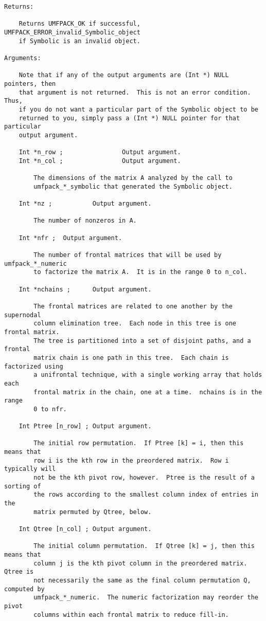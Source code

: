 {\begin{verbatim}
Returns:

    Returns UMFPACK_OK if successful, UMFPACK_ERROR_invalid_Symbolic_object
    if Symbolic is an invalid object.

Arguments:

    Note that if any of the output arguments are (Int *) NULL pointers, then
    that argument is not returned.  This is not an error condition.  Thus,
    if you do not want a particular part of the Symbolic object to be
    returned to you, simply pass a (Int *) NULL pointer for that particular
    output argument.

    Int *n_row ;                Output argument.
    Int *n_col ;                Output argument.

        The dimensions of the matrix A analyzed by the call to
        umfpack_*_symbolic that generated the Symbolic object.

    Int *nz ;           Output argument.

        The number of nonzeros in A.

    Int *nfr ;  Output argument.

        The number of frontal matrices that will be used by umfpack_*_numeric
        to factorize the matrix A.  It is in the range 0 to n_col.

    Int *nchains ;      Output argument.

        The frontal matrices are related to one another by the supernodal
        column elimination tree.  Each node in this tree is one frontal matrix.
        The tree is partitioned into a set of disjoint paths, and a frontal
        matrix chain is one path in this tree.  Each chain is factorized using
        a unifrontal technique, with a single working array that holds each
        frontal matrix in the chain, one at a time.  nchains is in the range
        0 to nfr.

    Int Ptree [n_row] ; Output argument.

        The initial row permutation.  If Ptree [k] = i, then this means that
        row i is the kth row in the preordered matrix.  Row i typically will
        not be the kth pivot row, however.  Ptree is the result of a sorting of
        the rows according to the smallest column index of entries in the
        matrix permuted by Qtree, below.

    Int Qtree [n_col] ; Output argument.

        The initial column permutation.  If Qtree [k] = j, then this means that
        column j is the kth pivot column in the preordered matrix.  Qtree is
        not necessarily the same as the final column permutation Q, computed by
        umfpack_*_numeric.  The numeric factorization may reorder the pivot
        columns within each frontal matrix to reduce fill-in.


\end{verbatim}}

